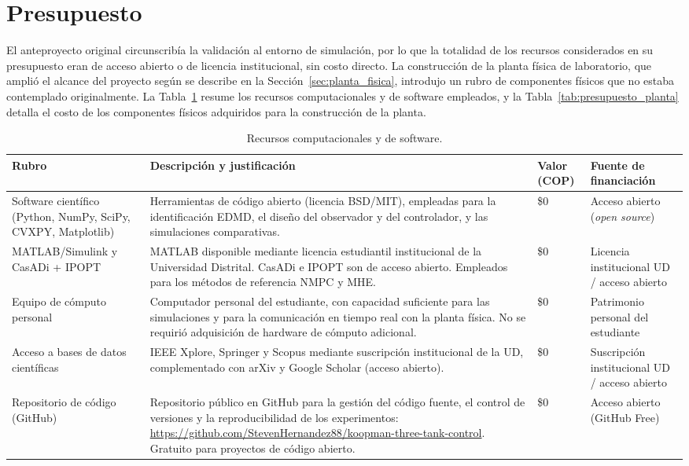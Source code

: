 \documentclass[12pt,letterpaper]{article}
\begin{document}
\section{Presupuesto}
\label{sec:presupuesto}

El anteproyecto original circunscribía la validación al entorno de simulación, por lo
que la totalidad de los recursos considerados en su presupuesto eran de acceso
abierto o de licencia institucional, sin costo directo. La construcción de la planta
física de laboratorio, que amplió el alcance del proyecto según se describe en la
Sección~\ref{sec:planta_fisica}, introdujo un rubro de componentes físicos que no
estaba contemplado originalmente. La Tabla~\ref{tab:presupuesto_software} resume los
recursos computacionales y de software empleados, y la Tabla~\ref{tab:presupuesto_planta}
detalla el costo de los componentes físicos adquiridos para la construcción de la
planta.

\begin{table}[H]
\centering
\caption{Recursos computacionales y de software.}
\label{tab:presupuesto_software}
\begin{tabular}{p{3.2cm}p{7cm}p{1.6cm}p{2.8cm}}
\toprule
\textbf{Rubro} & \textbf{Descripción y justificación} & \textbf{Valor (COP)} & \textbf{Fuente de financiación} \\
\midrule
Software científico (Python, NumPy, SciPy, CVXPY, Matplotlib) &
Herramientas de código abierto (licencia BSD/MIT), empleadas para la identificación
EDMD, el diseño del observador y del controlador, y las simulaciones comparativas. &
\$0 & Acceso abierto (\textit{open source}) \\
MATLAB/Simulink y CasADi + IPOPT &
MATLAB disponible mediante licencia estudiantil institucional de la Universidad
Distrital. CasADi e IPOPT son de acceso abierto. Empleados para los métodos de
referencia NMPC y MHE. &
\$0 & Licencia institucional UD / acceso abierto \\
Equipo de cómputo personal &
Computador personal del estudiante, con capacidad suficiente para las simulaciones y
para la comunicación en tiempo real con la planta física. No se requirió adquisición
de hardware de cómputo adicional. &
\$0 & Patrimonio personal del estudiante \\
Acceso a bases de datos científicas &
IEEE Xplore, Springer y Scopus mediante suscripción institucional de la UD,
complementado con arXiv y Google Scholar (acceso abierto). &
\$0 & Suscripción institucional UD / acceso abierto \\
Repositorio de código (GitHub) &
Repositorio público en GitHub para la gestión del código fuente, el control de
versiones y la reproducibilidad de los experimentos:
\url{https://github.com/StevenHernandez88/koopman-three-tank-control}. Gratuito
para proyectos de código abierto. &
\$0 & Acceso abierto (GitHub Free) \\
\bottomrule
\end{tabular}
\end{table}
\end{document}
